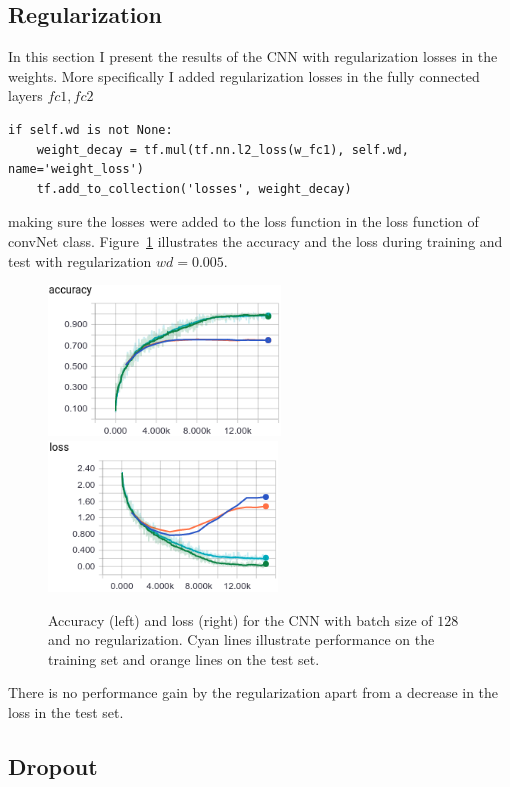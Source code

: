 \documentclass{article}
\begin{document}
\subsection{Regularization}
\label{sec:reg}

In this section I present the results of the CNN with regularization losses in the weights.
More specifically I added regularization losses in the fully connected layers $fc1, fc2$
\begin{verbatim}
if self.wd is not None:
    weight_decay = tf.mul(tf.nn.l2_loss(w_fc1), self.wd, name='weight_loss')
    tf.add_to_collection('losses', weight_decay)
\end{verbatim}
making sure the losses were added to the loss function in the loss function of convNet class.
Figure~\ref{fig:2} illustrates the accuracy and the loss during training and test with regularization $wd=0.005$.
\begin{figure}[h!]
\centering
\includegraphics[height=4.0cm]{acc-plain-reg.png}\
\includegraphics[height=4.0cm]{loss-plain-reg.png}
\caption{Accuracy (left) and loss (right) for the CNN with batch size of $128$ and no regularization. Cyan lines illustrate performance on the training set and orange lines on the test set.}
\label{fig:2}
\end{figure}
There is no performance gain by the regularization apart from a decrease in the loss in the test set.




\subsection{Dropout}
\end{document}
